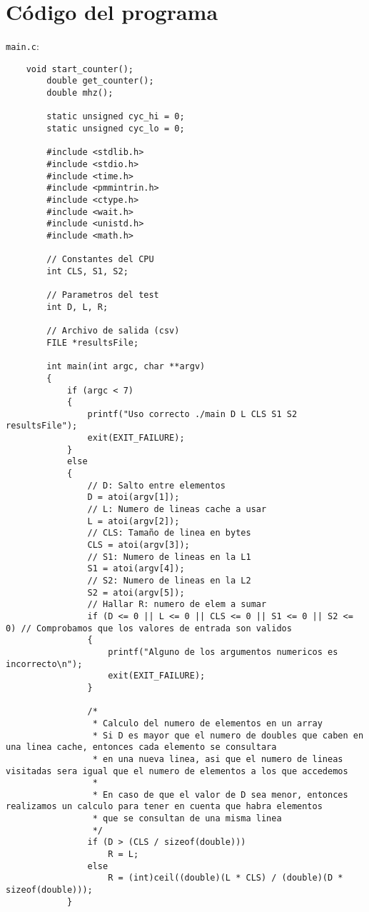 \documentclass[a4paper,twocolumn]{article}
\begin{document}
    \newpage
    \onecolumn
    \printbibliography
	\appendix 
	\section{Código del programa}
	
	\Large{\texttt{main.c}:}
	\begin{lstlisting}
    void start_counter();
        double get_counter();
        double mhz();
        
        static unsigned cyc_hi = 0;
        static unsigned cyc_lo = 0;
        
        #include <stdlib.h>
        #include <stdio.h>
        #include <time.h>
        #include <pmmintrin.h>
        #include <ctype.h>
        #include <wait.h>
        #include <unistd.h>
        #include <math.h>
        
        // Constantes del CPU
        int CLS, S1, S2;
        
        // Parametros del test
        int D, L, R;
        
        // Archivo de salida (csv)
        FILE *resultsFile;
        
        int main(int argc, char **argv)
        {
            if (argc < 7)
            {
                printf("Uso correcto ./main D L CLS S1 S2 resultsFile");
                exit(EXIT_FAILURE);
            }
            else
            {
                // D: Salto entre elementos
                D = atoi(argv[1]);
                // L: Numero de lineas cache a usar
                L = atoi(argv[2]);
                // CLS: Tamaño de linea en bytes
                CLS = atoi(argv[3]);
                // S1: Numero de lineas en la L1
                S1 = atoi(argv[4]);
                // S2: Numero de lineas en la L2
                S2 = atoi(argv[5]);
                // Hallar R: numero de elem a sumar
                if (D <= 0 || L <= 0 || CLS <= 0 || S1 <= 0 || S2 <= 0) // Comprobamos que los valores de entrada son validos
                {
                    printf("Alguno de los argumentos numericos es incorrecto\n");
                    exit(EXIT_FAILURE);
                }
        
                /*
                 * Calculo del numero de elementos en un array
                 * Si D es mayor que el numero de doubles que caben en una linea cache, entonces cada elemento se consultara
                 * en una nueva linea, asi que el numero de lineas visitadas sera igual que el numero de elementos a los que accedemos
                 *
                 * En caso de que el valor de D sea menor, entonces realizamos un calculo para tener en cuenta que habra elementos
                 * que se consultan de una misma linea
                 */
                if (D > (CLS / sizeof(double)))
                    R = L;
                else
                    R = (int)ceil((double)(L * CLS) / (double)(D * sizeof(double)));
            }
        

\end{lstlisting}
\end{document}
